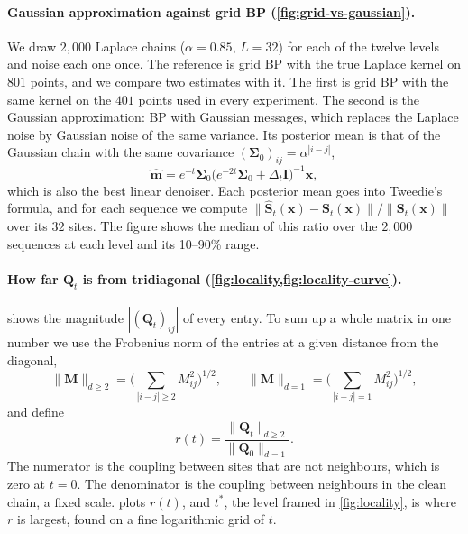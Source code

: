 \paragraph{Gaussian approximation against grid BP (\cref{fig:grid-vs-gaussian}).} We draw $2{,}000$ Laplace chains
($\alpha=0.85$, $L=32$) for each of the twelve levels and noise each one once. The reference is grid BP with the true
Laplace kernel on $801$ points, and we compare two estimates with it. The first is grid BP with the same kernel on the
$401$ points used in every experiment. The second is the Gaussian approximation: BP with Gaussian messages, which
replaces the Laplace noise by Gaussian noise of the same variance. Its posterior mean is that of the Gaussian chain with
the same covariance $(\boldsymbol\Sigma_0)_{ij}=\alpha^{|i-j|}$,
\begin{equation}
  \widehat{\mathbf m}=e^{-t}\boldsymbol\Sigma_0\big(e^{-2t}\boldsymbol\Sigma_0+\Delta_t\mathbf I\big)^{-1}\mathbf x,
\end{equation}
which is also the best linear denoiser. Each posterior mean goes into Tweedie's formula, and for each sequence we
compute $\|\widehat{\mathbf S}_t(\mathbf x)-\mathbf S_t(\mathbf x)\|/\|\mathbf S_t(\mathbf x)\|$ over its $32$
sites. The figure shows the median of this ratio over the $2{,}000$ sequences at each level and its 10--90\% range.

\paragraph{How far $\mathbf Q_t$ is from tridiagonal (\cref{fig:locality,fig:locality-curve}).} 
shows the magnitude $|(\mathbf Q_t)_{ij}|$ of every entry. To sum up a whole matrix in one number we use the Frobenius
norm of the entries at a given distance from the diagonal,
\begin{equation}
  \|\mathbf M\|_{d\ge2}=\Big(\sum_{|i-j|\ge2}M_{ij}^2\Big)^{1/2},
  \qquad
  \|\mathbf M\|_{d=1}=\Big(\sum_{|i-j|=1}M_{ij}^2\Big)^{1/2},
\end{equation}
and define
\begin{equation}
  r(t)=\frac{\|\mathbf Q_t\|_{d\ge2}}{\|\mathbf Q_0\|_{d=1}} .
\end{equation}
The numerator is the coupling between sites that are not neighbours, which is zero at $t=0$. The denominator is the
coupling between neighbours in the clean chain, a fixed scale.  plots $r(t)$, and $t^{*}$,
the level framed in \cref{fig:locality}, is where $r$ is largest, found on a fine logarithmic grid of $t$.


